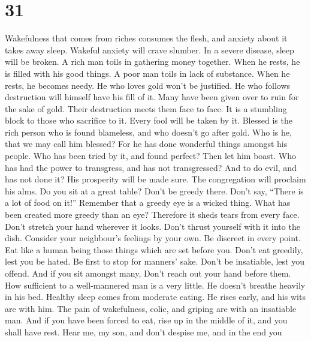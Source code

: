 \hypertarget{section-26}{%
\section{31}\label{section-26}}

 Wakefulness that comes from riches consumes the flesh, and
anxiety about it takes away sleep.  Wakeful anxiety will
crave slumber. In a severe disease, sleep will be broken.  A
rich man toils in gathering money together. When he rests, he is filled
with his good things.  A poor man toils in lack of
substance. When he rests, he becomes needy.  He who loves
gold won't be justified. He who follows destruction will himself have
his fill of it.  Many have been given over to ruin for the
sake of gold. Their destruction meets them face to face.  It
is a stumbling block to those who sacrifice to it. Every fool will be
taken by it.  Blessed is the rich person who is found
blameless, and who doesn't go after gold.  Who is he, that
we may call him blessed? For he has done wonderful things amongst his
people.  Who has been tried by it, and found perfect? Then
let him boast. Who has had the power to transgress, and has not
transgressed? And to do evil, and has not done it?  His
prosperity will be made sure. The congregation will proclaim his alms.
 Do you sit at a great table? Don't be greedy there. Don't
say, ``There is a lot of food on it!''  Remember that a
greedy eye is a wicked thing. What has been created more greedy than an
eye? Therefore it sheds tears from every face.  Don't
stretch your hand wherever it looks. Don't thrust yourself with it into
the dish.  Consider your neighbour's feelings by your own.
Be discreet in every point.  Eat like a human being those
things which are set before you. Don't eat greedily, lest you be hated.
 Be first to stop for manners' sake. Don't be insatiable,
lest you offend.  And if you sit amongst many, Don't reach
out your hand before them.  How sufficient to a
well-mannered man is a very little. He doesn't breathe heavily in his
bed.  Healthy sleep comes from moderate eating. He rises
early, and his wits are with him. The pain of wakefulness, colic, and
griping are with an insatiable man.  And if you have been
forced to eat, rise up in the middle of it, and you shall have rest.
 Hear me, my son, and don't despise me, and in the end you
